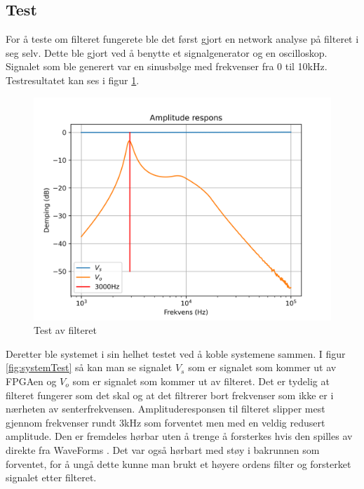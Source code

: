 \subsection{Test}
\label{test}
For å teste om filteret fungerete ble det først gjort en network analyse på filteret i seg selv. Dette ble gjort ved å benytte et signalgenerator og en oscilloskop. Signalet som ble generert var en sinusbølge med frekvenser fra 0 til 10kHz. Testresultatet kan ses i figur \ref{fig:filterTest}.

\begin{figure} [!h]
\centering
\includegraphics[width=1\linewidth]{Bilder/Network2.png}
\caption{Test av filteret}
\label{fig:filterTest}
\end{figure}

Deretter ble systemet i sin helhet testet ved å koble systemene sammen. I figur \ref{fig:systemTest} så kan man se signalet $V_s$ som er signalet som kommer ut av FPGAen og $V_{o}$ som er signalet som kommer ut av filteret. Det er tydelig at filteret fungerer som det skal og at det filtrerer bort frekvenser som ikke er i nærheten av senterfrekvensen. Amplituderesponsen til filteret slipper mest gjennom frekvenser rundt 3kHz som forventet men med en veldig redusert amplitude. Den er fremdeles hørbar uten å trenge å forsterkes hvis den spilles av direkte fra WaveForms \cite[Digilent Inc.]{Ocili}. Det var også hørbart med støy i bakrunnen som forventet, for å ungå dette kunne man brukt et høyere ordens filter og forsterket signalet etter filteret.



